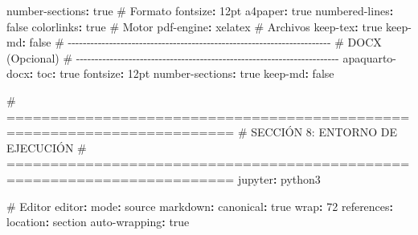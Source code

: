 \documentclass[
  doc,
  floatsintext,
  longtable,
  a4paper,
  nolmodern,
  notxfonts,
  notimes,
  12pt,
  colorlinks=true,linkcolor=blue,citecolor=blue,urlcolor=blue]{apa7}
\newenvironment{Shaded}{\begin{snugshade}}{\end{snugshade}}
\newcommand{\AttributeTok}[1]{\textcolor[rgb]{0.40,0.45,0.13}{#1}}
\newcommand{\CharTok}[1]{\textcolor[rgb]{0.13,0.47,0.30}{#1}}
\newcommand{\CommentTok}[1]{\textcolor[rgb]{0.37,0.37,0.37}{#1}}
\newcommand{\DecValTok}[1]{\textcolor[rgb]{0.68,0.00,0.00}{#1}}
\newcommand{\FunctionTok}[1]{\textcolor[rgb]{0.28,0.35,0.67}{#1}}
\newcommand{\KeywordTok}[1]{\textcolor[rgb]{0.00,0.23,0.31}{\textbf{#1}}}
\begin{document}
\begin{Shaded}
\begin{Highlighting}[]
\AttributeTok{    }\FunctionTok{number{-}sections}\KeywordTok{:}\AttributeTok{ }\CharTok{true}
\AttributeTok{    }
\CommentTok{    \# Formato}
\AttributeTok{    }\FunctionTok{fontsize}\KeywordTok{:}\AttributeTok{ 12pt}
\AttributeTok{    }\FunctionTok{a4paper}\KeywordTok{:}\AttributeTok{ }\CharTok{true}
\AttributeTok{    }\FunctionTok{numbered{-}lines}\KeywordTok{:}\AttributeTok{ }\CharTok{false}
\AttributeTok{    }\FunctionTok{colorlinks}\KeywordTok{:}\AttributeTok{ }\CharTok{true}
\AttributeTok{    }
\CommentTok{    \# Motor}
\AttributeTok{    }\FunctionTok{pdf{-}engine}\KeywordTok{:}\AttributeTok{ xelatex}
\AttributeTok{    }
\CommentTok{    \# Archivos}
\AttributeTok{    }\FunctionTok{keep{-}tex}\KeywordTok{:}\AttributeTok{ }\CharTok{true}
\AttributeTok{    }\FunctionTok{keep{-}md}\KeywordTok{:}\AttributeTok{ }\CharTok{false}
\AttributeTok{    }
\CommentTok{  \# {-}{-}{-}{-}{-}{-}{-}{-}{-}{-}{-}{-}{-}{-}{-}{-}{-}{-}{-}{-}{-}{-}{-}{-}{-}{-}{-}{-}{-}{-}{-}{-}{-}{-}{-}{-}{-}{-}{-}{-}{-}{-}{-}{-}{-}{-}{-}{-}{-}{-}{-}{-}{-}{-}{-}{-}{-}{-}{-}{-}{-}{-}{-}{-}{-}{-}{-}{-}{-}{-}}
\CommentTok{  \# DOCX (Opcional)}
\CommentTok{  \# {-}{-}{-}{-}{-}{-}{-}{-}{-}{-}{-}{-}{-}{-}{-}{-}{-}{-}{-}{-}{-}{-}{-}{-}{-}{-}{-}{-}{-}{-}{-}{-}{-}{-}{-}{-}{-}{-}{-}{-}{-}{-}{-}{-}{-}{-}{-}{-}{-}{-}{-}{-}{-}{-}{-}{-}{-}{-}{-}{-}{-}{-}{-}{-}{-}{-}{-}{-}{-}{-}}
\AttributeTok{  }\FunctionTok{apaquarto{-}docx}\KeywordTok{:}
\AttributeTok{    }\FunctionTok{toc}\KeywordTok{:}\AttributeTok{ }\CharTok{true}
\AttributeTok{    }\FunctionTok{fontsize}\KeywordTok{:}\AttributeTok{ 12pt}
\AttributeTok{    }\FunctionTok{number{-}sections}\KeywordTok{:}\AttributeTok{ }\CharTok{true}
\AttributeTok{    }\FunctionTok{keep{-}md}\KeywordTok{:}\AttributeTok{ }\CharTok{false}

\CommentTok{\# ========================================================================}
\CommentTok{\# SECCIÓN 8: ENTORNO DE EJECUCIÓN}
\CommentTok{\# ========================================================================}
\FunctionTok{jupyter}\KeywordTok{:}\AttributeTok{ python3}

\CommentTok{\# Editor}
\FunctionTok{editor}\KeywordTok{:}
\AttributeTok{  }\FunctionTok{mode}\KeywordTok{:}\AttributeTok{ source}
\AttributeTok{  }\FunctionTok{markdown}\KeywordTok{:}
\AttributeTok{    }\FunctionTok{canonical}\KeywordTok{:}\AttributeTok{ }\CharTok{true}
\AttributeTok{    }\FunctionTok{wrap}\KeywordTok{:}\AttributeTok{ }\DecValTok{72}
\AttributeTok{    }\FunctionTok{references}\KeywordTok{:}
\AttributeTok{      }\FunctionTok{location}\KeywordTok{:}\AttributeTok{ section}
\AttributeTok{    }\FunctionTok{auto{-}wrapping}\KeywordTok{:}\AttributeTok{ }\CharTok{true}


\end{Highlighting}
\end{Shaded}
\end{document}
